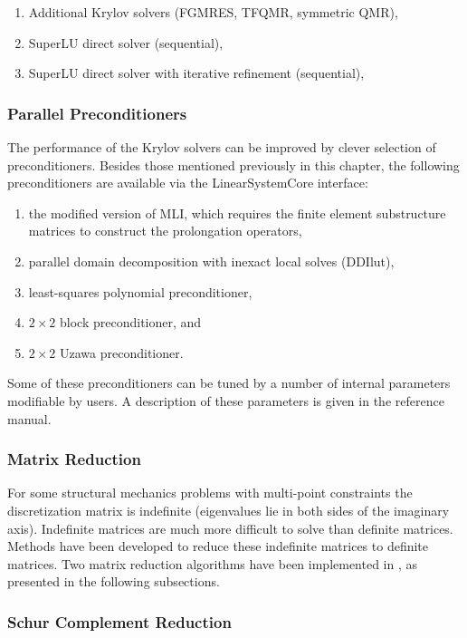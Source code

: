 \begin{enumerate}
\item Additional Krylov solvers (FGMRES, TFQMR, symmetric QMR),
\item SuperLU direct solver (sequential),
\item SuperLU direct solver with iterative refinement (sequential), 
\end{enumerate}

\subsubsection{Parallel Preconditioners} 

The performance of the Krylov solvers can be improved by clever selection
of preconditioners. Besides those mentioned previously
in this chapter, the following preconditioners are
available via the {\sf LinearSystemCore} interface: 

\begin{enumerate}
\item the modified version of MLI, which requires the finite element substructure matrices
to construct the prolongation operators,
\item parallel domain decomposition with inexact local solves ({\sf DDIlut}), 
\item least-squares polynomial preconditioner,
\item $2 \times 2$ block preconditioner, and
\item $2 \times 2$ Uzawa preconditioner.
\end{enumerate}

Some of these preconditioners can be tuned by a number of internal parameters
modifiable by users. A description of these parameters is given in the reference manual.

\subsubsection{Matrix Reduction} 

For some structural mechanics problems with multi-point constraints the 
discretization matrix is indefinite (eigenvalues lie in both sides of
the imaginary axis). Indefinite matrices are much more difficult to solve
than definite matrices. Methods have been developed to reduce these
indefinite matrices to definite matrices.  Two matrix reduction algorithms
have been implemented in \hypre{}, as presented in the following subsections.

\subsubsection{Schur Complement Reduction}

